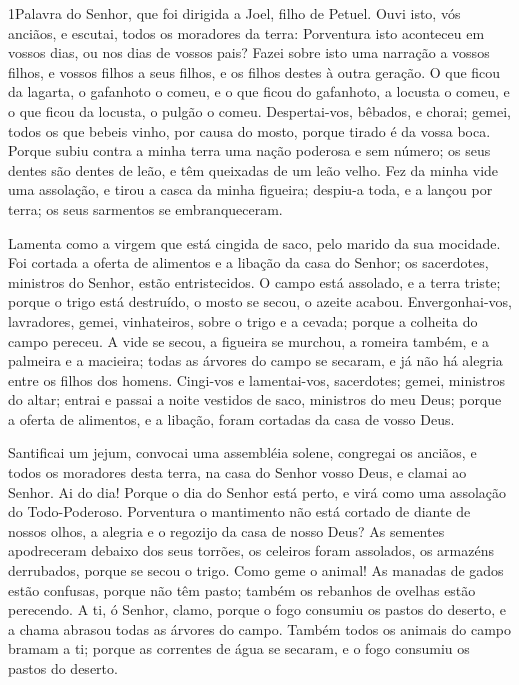 
\lettrine{1} Palavra do Senhor, que foi dirigida a Joel, filho
de Petuel. Ouvi isto, vós anciãos, e escutai, todos os moradores
da terra: Porventura isto aconteceu em vossos dias, ou nos dias de
vossos pais? Fazei sobre isto uma narração a vossos filhos, e
vossos filhos a seus filhos, e os filhos destes à outra geração.
O que ficou da lagarta, o gafanhoto o comeu, e o que ficou do
gafanhoto, a locusta o comeu, e o que ficou da locusta, o pulgão o
comeu. Despertai-vos, bêbados, e chorai; gemei, todos os que
bebeis vinho, por causa do mosto, porque tirado é da vossa boca.
Porque subiu contra a minha terra uma nação poderosa e sem
número; os seus dentes são dentes de leão, e têm queixadas de um
leão velho. Fez da minha vide uma assolação, e tirou a casca da
minha figueira; despiu-a toda, e a lançou por terra; os seus
sarmentos se embranqueceram.

Lamenta como a virgem que está cingida de saco, pelo marido da sua
mocidade. Foi cortada a oferta de alimentos e a libação da casa
do Senhor; os sacerdotes, ministros do Senhor, estão entristecidos.
O campo está assolado, e a terra triste; porque o trigo está
destruído, o mosto se secou, o azeite acabou.
Envergonhai-vos, lavradores, gemei, vinhateiros, sobre o
trigo e a cevada; porque a colheita do campo pereceu. A vide
se secou, a figueira se murchou, a romeira também, e a palmeira e a
macieira; todas as árvores do campo se secaram, e já não há alegria
entre os filhos dos homens. Cingi-vos e lamentai-vos,
sacerdotes; gemei, ministros do altar; entrai e passai a noite
vestidos de saco, ministros do meu Deus; porque a oferta de
alimentos, e a libação, foram cortadas da casa de vosso Deus.

Santificai um jejum, convocai uma assembléia solene, congregai os
anciãos, e todos os moradores desta terra, na casa do Senhor vosso
Deus, e clamai ao Senhor. Ai do dia! Porque o dia do Senhor
está perto, e virá como uma assolação do Todo-Poderoso.
Porventura o mantimento não está cortado de diante de nossos
olhos, a alegria e o regozijo da casa de nosso Deus? As
sementes apodreceram debaixo dos seus torrões, os celeiros foram
assolados, os armazéns derrubados, porque se secou o trigo.
Como geme o animal! As manadas de gados estão confusas,
porque não têm pasto; também os rebanhos de ovelhas estão perecendo.
A ti, ó Senhor, clamo, porque o fogo consumiu os pastos do
deserto, e a chama abrasou todas as árvores do campo. Também
todos os animais do campo bramam a ti; porque as correntes de água
se secaram, e o fogo consumiu os pastos do deserto.

